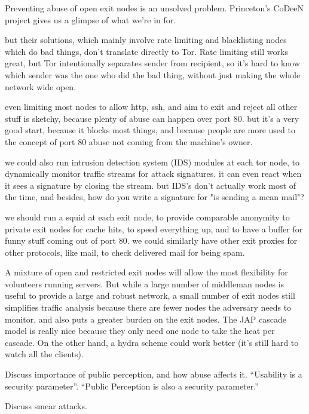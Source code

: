 \documentclass[times,10pt,twocolumn]{article}
\begin{document}
Preventing abuse of open exit nodes is an unsolved problem. Princeton's
CoDeeN project \cite{darkside} gives us a glimpse of what we're in for.

but their solutions, which mainly involve rate limiting and blacklisting
nodes which do bad things, don't translate directly to Tor. Rate limiting
still works great, but Tor intentionally separates sender from recipient,
so it's hard to know which sender was the one who did the bad thing,
without just making the whole network wide open.

even limiting most nodes to allow http, ssh, and aim to exit and reject
all other stuff is sketchy, because plenty of abuse can happen over
port 80. but it's a very good start, because it blocks most things,
and because people are more used to the concept of port 80 abuse not
coming from the machine's owner.

we could also run intrusion detection system (IDS) modules at each tor
node, to dynamically monitor traffic streams for attack signatures. it
can even react when it sees a signature by closing the stream. but IDS's
don't actually work most of the time, and besides, how do you write a
signature for "is sending a mean mail"?

we should run a squid at each exit node, to provide comparable anonymity
to private exit nodes for cache hits, to speed everything up, and to
have a buffer for funny stuff coming out of port 80. we could similarly
have other exit proxies for other protocols, like mail, to check
delivered mail for being spam.

A mixture of open and restricted exit nodes will allow the most
flexibility for volunteers running servers. But while a large number
of middleman nodes is useful to provide a large and robust network,
a small number of exit nodes still simplifies traffic analysis because
there are fewer nodes the adversary needs to monitor, and also puts a
greater burden on the exit nodes.
The JAP cascade model is really nice because they only need one node to
take the heat per cascade. On the other hand, a hydra scheme could work
better (it's still hard to watch all the clients).

Discuss importance of public perception, and how abuse affects it.
``Usability is a security parameter''.  ``Public Perception is also a
security parameter.''

Discuss smear attacks.

\label{subsec:dirservers}
\end{document}
